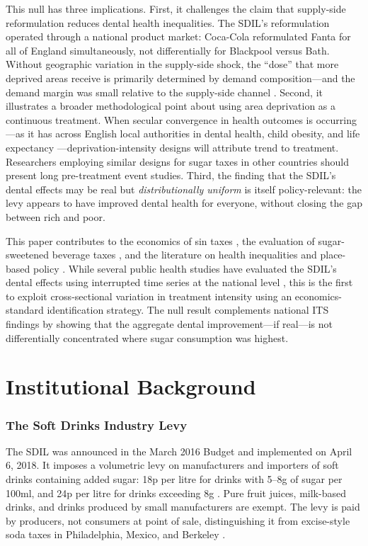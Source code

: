 \documentclass[12pt]{article}
\begin{document}
This null has three implications. First, it challenges the claim that supply-side reformulation reduces dental health inequalities. The SDIL's reformulation operated through a national product market: Coca-Cola reformulated Fanta for all of England simultaneously, not differentially for Blackpool versus Bath. Without geographic variation in the supply-side shock, the ``dose'' that more deprived areas receive is primarily determined by demand composition---and the demand margin was small relative to the supply-side channel \citep{pell2021sdilreformulation, scarborough2020sdil}. Second, it illustrates a broader methodological point about using area deprivation as a continuous treatment. When secular convergence in health outcomes is occurring---as it has across English local authorities in dental health, child obesity, and life expectancy \citep{marmot2010review}---deprivation-intensity designs will attribute trend to treatment. Researchers employing similar designs for sugar taxes in other countries should present long pre-treatment event studies. Third, the finding that the SDIL's dental effects may be real but \textit{distributionally uniform} is itself policy-relevant: the levy appears to have improved dental health for everyone, without closing the gap between rich and poor.

This paper contributes to the economics of sin taxes \citep{allcott2019regressive, cawley2019sugar}, the evaluation of sugar-sweetened beverage taxes \citep{colchero2016mexico, seiler2021sugar, cawley2021philadelphia}, and the literature on health inequalities and place-based policy \citep{macintyre2002area}. While several public health studies have evaluated the SDIL's dental effects using interrupted time series at the national level \citep{rogers2024sdil, sheringham2025sdil}, this is the first to exploit cross-sectional variation in treatment intensity using an economics-standard identification strategy. The null result complements national ITS findings by showing that the aggregate dental improvement---if real---is not differentially concentrated where sugar consumption was highest.


\section{Institutional Background}

\subsubsection*{The Soft Drinks Industry Levy} The SDIL was announced in the March 2016 Budget and implemented on April 6, 2018. It imposes a volumetric levy on manufacturers and importers of soft drinks containing added sugar: 18p per litre for drinks with 5--8g of sugar per 100ml, and 24p per litre for drinks exceeding 8g \citep{hmrc2023sdil}. Pure fruit juices, milk-based drinks, and drinks produced by small manufacturers are exempt. The levy is paid by producers, not consumers at point of sale, distinguishing it from excise-style soda taxes in Philadelphia, Mexico, and Berkeley \citep{cawley2021philadelphia, colchero2016mexico, seiler2021sugar}.
\end{document}
